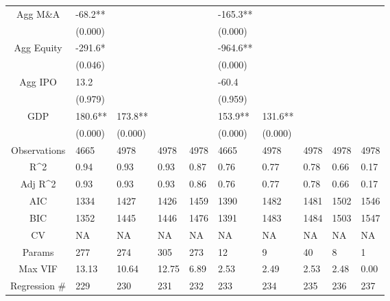 \documentclass{article}
\begin{document}
\begin{table}[H]
\begin{tabular}{|clllllllll|}
  Agg M\&A & -68.2** &  &  &  & -165.3** &  &  &  &  \\ 
   & (0.000) &  &  &  & (0.000) &  &  &  &  \\ 
  Agg Equity & -291.6* &  &  &  & -964.6** &  &  &  &  \\ 
   & (0.046) &  &  &  & (0.000) &  &  &  &  \\ 
  Agg IPO & 13.2 &  &  &  & -60.4 &  &  &  &  \\ 
   & (0.979) &  &  &  & (0.959) &  &  &  &  \\ 
  GDP & 180.6** & 173.8** &  &  & 153.9** & 131.6** &  &  &  \\ 
   & (0.000) & (0.000) &  &  & (0.000) & (0.000) &  &  &  \\ 
  \hline 
 Observations & 4665 & 4978 & 4978 & 4978 & 4665 & 4978 & 4978 & 4978 & 4978 \\ 
  R^2 & 0.94 & 0.93 & 0.93 & 0.87 & 0.76 & 0.77 & 0.78 & 0.66 & 0.17 \\ 
  Adj R^2 & 0.93 & 0.93 & 0.93 & 0.86 & 0.76 & 0.77 & 0.78 & 0.66 & 0.17 \\ 
  AIC & 1334 & 1427 & 1426 & 1459 & 1390 & 1482 & 1481 & 1502 & 1546 \\ 
  BIC & 1352 & 1445 & 1446 & 1476 & 1391 & 1483 & 1484 & 1503 & 1547 \\ 
  CV & NA & NA & NA & NA & NA & NA & NA & NA & NA \\ 
  Params & 277 & 274 & 305 & 273 & 12 & 9 & 40 & 8 & 1 \\ 
  Max VIF & 13.13 & 10.64 & 12.75 & 6.89 & 2.53 & 2.49 & 2.53 & 2.48 & 0.00 \\ 
  Regression \# & 229 & 230 & 231 & 232 & 233 & 234 & 235 & 236 & 237 \\ 
   \hline
\end{tabular}
 
\end{table}
\end{document}
